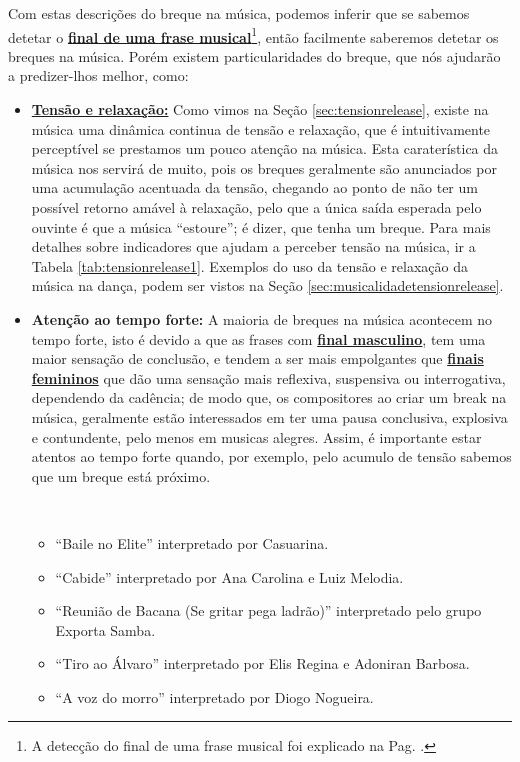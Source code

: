 Com estas descrições do breque na música, 
podemos inferir que se sabemos detetar o 
\hyperref[pos:detetandofinalfrase]{\textbf{final de uma frase musical}}\footnote{A
detecção do final de uma frase musical foi explicado na Pag. \pageref{pos:detetandofinalfrase}.},
então facilmente saberemos detetar os breques na música.
Porém existem particularidades do breque,
que nós ajudarão a predizer-lhos melhor, como:
\begin{itemize}
\item \hyperref[sec:tensionrelease]{\textbf{Tensão e relaxação:}} Como vimos na Seção \ref{sec:tensionrelease},
existe na música uma dinâmica continua de tensão e relaxação,
que é intuitivamente perceptível se prestamos um pouco atenção  na música.
Esta caraterística da música nos servirá de muito, 
pois os breques geralmente são anunciados por uma acumulação acentuada da tensão,
chegando ao ponto de não ter um possível retorno amável à relaxação, 
pelo que a única saída esperada pelo ouvinte é que a música ``estoure'';
é dizer, que tenha um breque.
Para mais detalhes sobre indicadores que ajudam a perceber tensão na música, ir a Tabela \ref{tab:tensionrelease1}.
Exemplos do uso da tensão e relaxação da música na dança, podem ser vistos na Seção \ref{sec:musicalidadetensionrelease}.
\item \textbf{Atenção ao tempo forte:} A maioria de breques na música acontecem no tempo forte,
isto é devido a que as frases com \hyperref[subsubsec:finalmasculino]{\textbf{final masculino}},
tem uma maior sensação de conclusão, e tendem a ser mais empolgantes que 
\hyperref[subsubsec:finalfemenino]{\textbf{finais femininos}} que dão uma sensação mais reflexiva, 
suspensiva ou interrogativa, dependendo da cadência; de modo que, 
os compositores ao criar um break na música,
geralmente estão interessados em ter uma pausa conclusiva, explosiva e contundente,
pelo menos em musicas alegres.
Assim, é importante estar atentos ao tempo forte quando, por exemplo, 
pelo acumulo de tensão sabemos que um breque está próximo.
\begin{example}~
\label{ex:breakmasculinos}
\begin{itemize}
\item ``Baile no Elite'' interpretado por Casuarina.
\item ``Cabide'' interpretado por Ana Carolina e Luiz Melodia.
\item ``Reunião de Bacana (Se gritar pega ladrão)'' interpretado pelo grupo Exporta Samba.
\item ``Tiro ao Álvaro'' interpretado por Elis Regina e Adoniran Barbosa. 
\item ``A voz do morro'' interpretado por Diogo Nogueira.
\end{itemize}
\end{example}


\end{itemize}
